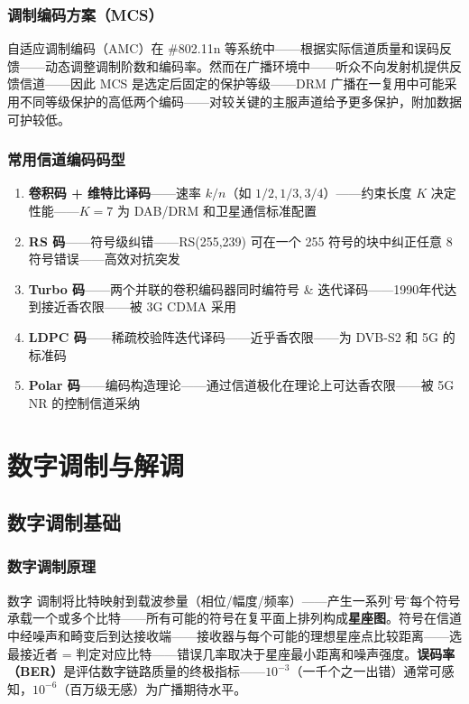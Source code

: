 \documentclass[12pt,UTF8]{ctexbook}
\begin{document}
\subsection{调制编码方案（MCS）}

自适应调制编码（AMC）在 \#802.11n 等系统中——根据实际信道质量和误码反馈——动态调整调制阶数和编码率。然而在广播环境中——听众不向发射机提供反馈信道——因此 MCS 是选定后固定的保护等级——DRM 广播在一复用中可能采用不同等级保护的高低两个编码——对较关键的主服声道给予更多保护，附加数据可护较低。

\subsection{常用信道编码码型}


\begin{enumerate}
\item \textbf{卷积码 + 维特比译码}——速率 $k/n$（如 $1/2,1/3,3/4$）——约束长度 $K$ 决定性能——$K=7$ 为 DAB/DRM 和卫星通信标准配置
\item \textbf{RS 码}——符号级纠错——RS(255,239) 可在一个 255 符号的块中纠正任意 8 符号错误——高效对抗突发
\item \textbf{Turbo 码}——两个并联的卷积编码器同时编符号 \& 迭代译码——1990年代达到接近香农限——被 3G CDMA 采用
\item \textbf{LDPC 码}——稀疏校验阵迭代译码——近乎香农限——为 DVB-S2 和 5G 的标准码
\item \textbf{Polar 码}——编码构造理论——通过信道极化在理论上可达香农限——被 5G NR 的控制信道采纳
\end{enumerate}


\chapter{数字调制与解调}
\label{chap:digital_mod_demod}

\section{数字调制基础}
\label{sec:digital_mod_basics}

\subsection{数字调制原理}

数字 调制将比特映射到载波参量（相位/幅度/频率）——产生一系列\"符号\"。每个符号承载一个或多个比特——所有可能的符号在复平面上排列构成\textbf{星座图}。符号在信道中经噪声和畸变后到达接收端——接收器与每个可能的理想星座点比较距离——选最接近者 = 判定对应比特——错误几率取决于星座最小距离和噪声强度。\textbf{误码率（BER）}是评估数字链路质量的终极指标——$10^{-3}$（一千个之一出错）通常可感知，$10^{-6}$（百万级无感）为广播期待水平。
\end{document}
